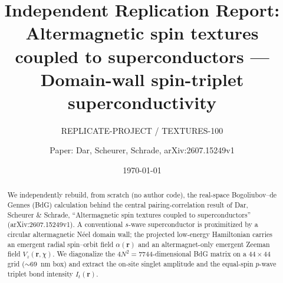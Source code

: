 \documentclass[11pt]{article}
\title{Independent Replication Report:\\
\textbf{Altermagnetic spin textures coupled to superconductors ---\\
Domain-wall spin-triplet superconductivity}}
\author{REPLICATE-PROJECT / TEXTURES-100 \and Paper: Dar, Scheurer, Schrade, arXiv:2607.15249v1}
\date{\today}
\begin{document}
\maketitle

\begin{abstract}
We independently rebuild, from scratch (no author code), the real-space
Bogoliubov--de Gennes (BdG) calculation behind the central pairing-correlation
result of Dar, Scheurer \& Schrade, ``Altermagnetic spin textures coupled to
superconductors'' (arXiv:2607.15249v1). A conventional $s$-wave superconductor is
proximitized by a circular altermagnetic N\'eel domain wall; the projected
low-energy Hamiltonian carries an emergent radial spin--orbit field
$\alpha(\mathbf r)$ and an altermagnet-only emergent Zeeman field
$V_z(\mathbf r,\chi)$. We diagonalize the $4N^2=7744$-dimensional BdG matrix on a
$44\times44$ grid ($\sim$69~nm box) and extract the on-site singlet amplitude and
the equal-spin $p$-wave triplet bond intensity $I_t(\mathbf r)$.

\medskip
\noindent{}
\end{abstract}
\end{document}
